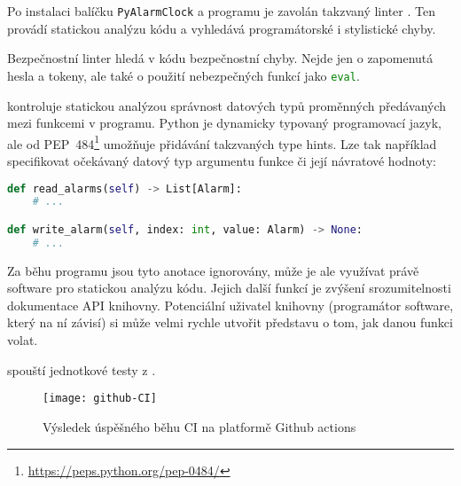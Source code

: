 Po instalaci balíčku \texttt{PyAlarmClock} a programu  je
zavolán takzvaný linter . Ten provádí statickou analýzu kódu
a vyhledává programátorské i stylistické chyby.

Bezpečnostní linter  hledá v kódu bezpečnostní chyby. Nejde
jen o zapomenutá hesla a tokeny, ale také o použití nebezpečných funkcí jako
\lstinline[language=Python]!eval!.

 kontroluje statickou analýzou správnost datových typů
proměnných předávaných mezi funkcemi v programu. Python je dynamicky typovaný
programovací jazyk, ale od
PEP~484\footnote{\url{https://peps.python.org/pep-0484/}} umožňuje přidávání
takzvaných \foreignlanguage{english}{type hints}. Lze tak například
specifikovat očekávaný datový typ argumentu funkce či její návratové hodnoty:
\begin{lstlisting}[language=Python]
def read_alarms(self) -> List[Alarm]:
    # ...

def write_alarm(self, index: int, value: Alarm) -> None:
    # ...
\end{lstlisting}
Za běhu programu jsou tyto anotace ignorovány, může je ale využívat právě
software pro statickou analýzu kódu. Jejich další funkcí je zvýšení
srozumitelnosti dokumentace API knihovny. Potenciální uživatel knihovny
(programátor software, který na ní závisí) si může velmi rychle utvořit
představu o tom, jak danou funkci volat.

 spouští jednotkové testy z .

\begin{figure}[htbp]
    \centering
    \texttt{[image: github-CI]}
    \caption{Výsledek úspěšného běhu \acs{CI} na platformě Github actions}
    \label{fig:PyAlarmClock CI}
\end{figure}
